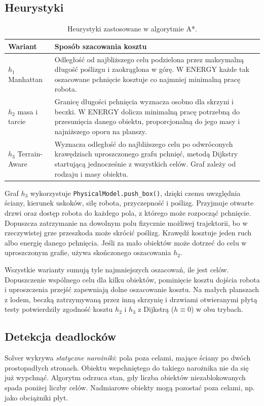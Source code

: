 \documentclass[a4paper,11pt]{article}
\begin{document}
\subsection{Heurystyki}
\begin{table}[H]
\centering\small
\caption{Heurystyki zastosowane w algorytmie A*.}
\label{tab:heuristics}
\begin{tabularx}{\linewidth}{@{}>{\raggedright\arraybackslash}p{2.5cm}X@{}}
\toprule
Wariant & Sposób szacowania kosztu \\
\midrule
$h_1$ Manhattan & Odległość od najbliższego celu podzielona przez maksymalną długość poślizgu i zaokrąglona w górę. W ENERGY każde tak oszacowane pchnięcie kosztuje co najmniej minimalną pracę robota. \\
$h_2$ masa i tarcie & Granicę długości pchnięcia wyznacza osobno dla skrzyni i beczki. W ENERGY dolicza minimalną pracę potrzebną do przesunięcia danego obiektu, proporcjonalną do jego masy i najniższego oporu na planszy. \\
$h_3$ Terrain-Aware & Wyznacza odległość do najbliższego celu po odwróconych krawędziach uproszczonego grafu pchnięć, metodą Dijkstry startującą jednocześnie z wszystkich celów. Graf zależy od rodzaju i masy obiektu. \\
\bottomrule
\end{tabularx}
\end{table}
Graf $h_3$ wykorzystuje \texttt{PhysicalModel.push\_box()}, dzięki czemu uwzględnia ściany, kierunek uskoków, siłę robota, przyczepność i poślizg. Przyjmuje otwarte drzwi oraz dostęp robota do każdego pola, z którego może rozpocząć pchnięcie. Dopuszcza zatrzymanie na dowolnym polu fizycznie możliwej trajektorii, bo w rzeczywistej grze przeszkoda może skrócić poślizg. Krawędź kosztuje jeden ruch albo energię danego pchnięcia. Jeśli za mało obiektów może dotrzeć do celu w uproszczonym grafie, używa skończonego oszacowania $h_2$.

Wszystkie warianty sumują tyle najmniejszych oszacowań, ile jest celów. Dopuszczenie wspólnego celu dla kilku obiektów, pominięcie kosztu dojścia robota i uproszczenia przejść zapewniają dolne oszacowanie kosztu. Na małych planszach z lodem, beczką zatrzymywaną przez inną skrzynię i drzwiami otwieranymi płytą testy potwierdziły zgodność kosztu $h_2$ i $h_3$ z Dijkstrą ($h\equiv0$) w obu trybach.

\subsection{Detekcja deadlocków}
Solver wykrywa \emph{statyczne narożniki}: pola poza celami, mające ściany po dwóch prostopadłych stronach. Obiektu wepchniętego do takiego narożnika nie da się już wypchnąć. Algorytm odrzuca stan, gdy liczba obiektów niezablokowanych spada poniżej liczby celów. Nadmiarowe obiekty mogą pozostać poza celami, np. jako obciążniki płyt.
\end{document}
